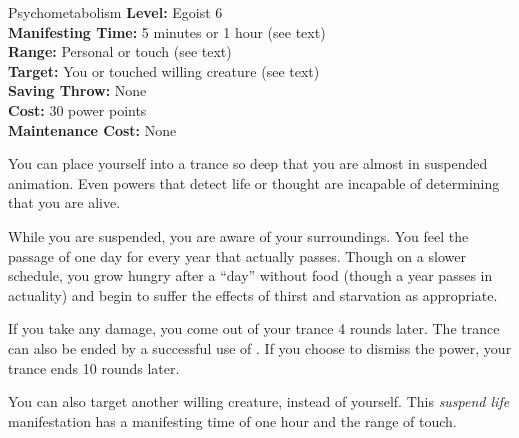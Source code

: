 {Psychometabolism}
{
	\textbf{Level:}
	Egoist 6\\
	\textbf{Manifesting Time:}
	5 minutes or 1 hour (see text)\\
	\textbf{Range:}
	Personal or touch (see text)\\
	\textbf{Target:}
	You or touched willing creature (see text)\\
	\textbf{Saving Throw:}
	None\\
	\textbf{Cost:}
	30 power points\\
	\textbf{Maintenance Cost:}
	None\\
}
{
	You can place yourself into a trance so deep that you are almost in suspended animation. Even powers that detect life or thought are incapable of determining that you are alive.

	While you are suspended, you are aware of your surroundings. You feel the passage of one day for every year that actually passes. Though on a slower schedule, you grow hungry after a ``day'' without food (though a year passes in actuality) and begin to suffer the effects of thirst and starvation as appropriate.

	If you take any damage, you come out of your trance 4 rounds later. The trance can also be ended by a successful use of . If you choose to dismiss the power, your trance ends 10 rounds later.

	You can also target another willing creature, instead of yourself. This \emph{suspend life} manifestation has a manifesting time of one hour and the range of touch. 
}